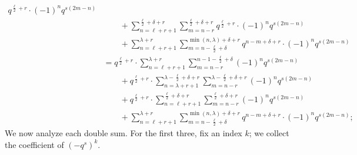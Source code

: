 \begin{align*}
    q^{\frac{\ell}{2}+r} \cdot (-1)^n q^{s(2m-n)} \\
  &\qquad+ \sum_{n=\ell+r+1}^{\frac{\ell}{2}+\delta+r}
    \sum_{m=n-r}^{\frac{\ell}{2}+\delta+r}
    q^{\frac{\ell}{2}+r} \cdot (-1)^n q^{s(2m-n)} \\
  &\qquad+ \sum_{n=\ell+r+1}^{\lambda+r}
    \sum_{m=n-\frac{\ell}{2}+\delta}^{\min(n,\lambda)+\delta+r}
    q^{n-m+\delta+r} \cdot (-1)^n q^{s(2m-n)} \\
  &= q^{\frac{\ell}{2}+r} \cdot \sum_{n=\ell+r+1}^{\lambda+r}
    \sum_{m=n-r}^{n-1-\frac{\ell}{2}+\delta}
    (-1)^n q^{s(2m-n)} \\
  &\qquad+ q^{\frac{\ell}{2}+r} \cdot \sum_{n=\lambda+r+1}^{\lambda-\frac{\ell}{2}+\delta+r}
    \sum_{m=n-r}^{\lambda-\frac{\ell}{2}+\delta+r}
    (-1)^n q^{s(2m-n)} \\
  &\qquad+ q^{\frac{\ell}{2}+r} \cdot \sum_{n=\ell+r+1}^{\frac{\ell}{2}+\delta+r}
    \sum_{m=n-r}^{\frac{\ell}{2}+\delta+r}
    (-1)^n q^{s(2m-n)} \\
  &\qquad+ \sum_{n=\ell+r+1}^{\lambda+r}
    \sum_{m=n-\frac{\ell}{2}+\delta}^{\min(n,\lambda)+\delta+r}
    q^{n-m+\delta+r} \cdot (-1)^n q^{s(2m-n)};
\end{align*}
We now analyze each double sum.
For the first three, fix an index $k$; we collect the coefficient of $(-q^s)^k$.
